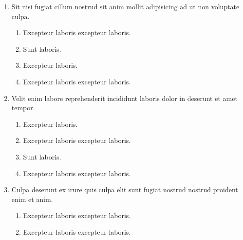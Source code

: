 \documentclass[a4paper,12pt]{article}
\begin{document}
\begin{enumerate}[label=\textbf{\arabic*.}]
\begin{multicols}{2}
\begin{enumerate}
		\item  Sunt laboris.
    
		\item  Excepteur laboris.
    
	\end{enumerate}

\end{multicols}
\item Sit nisi fugiat cillum nostrud sit anim mollit adipisicing ad ut non voluptate culpa.
\begin{multicols}{2}
	\begin{enumerate}
		\item  Excepteur laboris excepteur laboris.
    
		\item  Sunt laboris.
    
		\item  Excepteur laboris.
    
		\item  Excepteur laboris excepteur laboris.
  
	\end{enumerate}

\end{multicols}
\item Velit enim labore reprehenderit incididunt laboris dolor in deserunt et amet tempor.
\begin{multicols}{2}
	\begin{enumerate}
		\item  Excepteur laboris.
    
		\item  Excepteur laboris excepteur laboris.
  
		\item  Sunt laboris.
    
		\item  Excepteur laboris excepteur laboris.
    
	\end{enumerate}

\end{multicols}
\item Culpa deserunt ex irure quis culpa elit sunt fugiat nostrud nostrud proident enim et anim.
\begin{multicols}{2}
	\begin{enumerate}
		\item  Excepteur laboris excepteur laboris.
  
		\item  Excepteur laboris excepteur laboris.
    

\end{enumerate}
\end{multicols}
\end{enumerate}
\end{document}
